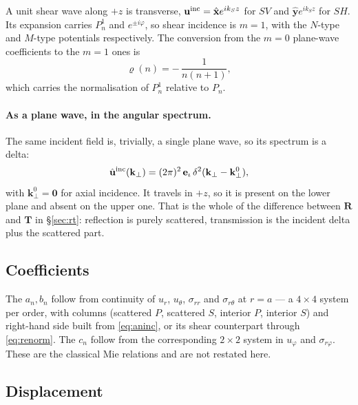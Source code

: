 \documentclass[11pt,a4paper]{article}
\newcommand{\bR}{\mathbf{R}}
\newcommand{\bT}{\mathbf{T}}
\newcommand{\bu}{\mathbf{u}}
\newcommand{\bk}{\mathbf{k}}
\newcommand{\bep}{\mathbf{e}}
\newcommand{\kperp}{\bk_\perp}
\begin{document}
A unit shear wave along $+z$ is transverse, $\bu^{\rm inc} = \hat{\mathbf{x}}
e^{ik_Sz}$ for $SV$ and $\hat{\mathbf{y}}e^{ik_Sz}$ for $SH$.  Its expansion
carries $P_n^1$ and $e^{\pm i\varphi}$, so shear incidence is $m=1$, with the
$N$-type and $M$-type potentials respectively.  The conversion from the $m=0$
plane-wave coefficients to the $m=1$ ones is
\begin{equation}\label{eq:renorm}
  \varrho(n) = -\,\frac{1}{n(n+1)} ,
\end{equation}
which carries the normalisation of $P_n^1$ relative to $P_n$.

\paragraph{As a plane wave, in the angular spectrum.}  The same incident field
is, trivially, a single plane wave, so its spectrum is a delta:
\begin{equation}\label{eq:incspec}
  \hat{\bu}^{\rm inc}(\kperp) = (2\pi)^2\,\bep_\iota\,\delta^2(\kperp - \kperp^0),
\end{equation}
with $\kperp^0 = \mathbf{0}$ for axial incidence.  It travels in $+z$, so it is
present on the lower plane and absent on the upper one.  That is the whole of
the difference between $\bR$ and $\bT$ in \S\ref{sec:rt}: reflection is purely
scattered, transmission is the incident delta plus the scattered part.

\subsection{Coefficients}

The $a_n,b_n$ follow from continuity of $u_r$, $u_\theta$, $\sigma_{rr}$ and
$\sigma_{r\theta}$ at $r=a$ --- a $4\times4$ system per order, with columns
(scattered $P$, scattered $S$, interior $P$, interior $S$) and right-hand side
built from \eqref{eq:aninc}, or its shear counterpart through
\eqref{eq:renorm}.  The $c_n$ follow from the corresponding $2\times2$ system
in $u_\varphi$ and $\sigma_{r\varphi}$.  These are the classical Mie relations
and are not restated here.

\subsection{Displacement}
\end{document}
